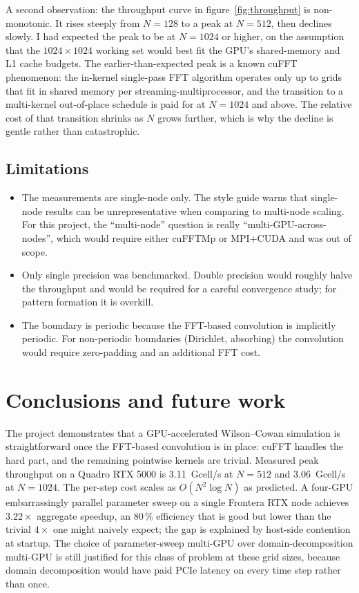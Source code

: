 \documentclass[11pt]{article}
\begin{document}
A second observation: the throughput curve in
figure~\ref{fig:throughput} is non-monotonic. It rises steeply from
$N = 128$ to a peak at $N = 512$, then declines slowly. I had
expected the peak to be at $N = 1024$ or higher, on the assumption
that the $1024 \times 1024$ working set would best fit the GPU's
shared-memory and L1 cache budgets. The earlier-than-expected peak
is a known cuFFT phenomenon: the in-kernel single-pass FFT algorithm
operates only up to grids that fit in shared memory per
streaming-multiprocessor, and the transition to a multi-kernel
out-of-place schedule is paid for at $N = 1024$ and above. The
relative cost of that transition shrinks as $N$ grows further, which
is why the decline is gentle rather than catastrophic.

\subsection{Limitations}

\begin{itemize}
  \item The measurements are single-node only. The style guide warns
  that single-node results can be unrepresentative when comparing to
  multi-node scaling. For this project, the ``multi-node'' question
  is really ``multi-GPU-across-nodes'', which would require either
  cuFFTMp or MPI+CUDA and was out of scope.
  \item Only single precision was benchmarked. Double precision would
  roughly halve the throughput and would be required for a careful
  convergence study; for pattern formation it is overkill.
  \item The boundary is periodic because the FFT-based convolution is
  implicitly periodic. For non-periodic boundaries (Dirichlet,
  absorbing) the convolution would require zero-padding and an
  additional FFT cost.
\end{itemize}

\section{Conclusions and future work}
\label{sec:conclusion}

The project demonstrates that a GPU-accelerated Wilson--Cowan
simulation is straightforward once the FFT-based convolution is in
place: cuFFT handles the hard part, and the remaining pointwise
kernels are trivial. Measured peak throughput on a Quadro RTX 5000
is \SI{3.11}{Gcell/s} at $N = 512$ and \SI{3.06}{Gcell/s} at
$N = 1024$. The per-step cost scales as $O(N^{2} \log N)$ as
predicted. A four-GPU embarrassingly parallel parameter sweep on a
single Frontera RTX node achieves $3.22\times$ aggregate speedup, an
80\,\% efficiency that is good but lower than the trivial $4\times$
one might naively expect; the gap is explained by host-side
contention at startup. The choice of parameter-sweep multi-GPU over
domain-decomposition multi-GPU is still justified for this class of
problem at these grid sizes, because domain decomposition would have
paid PCIe latency on every time step rather than once.
\end{document}
